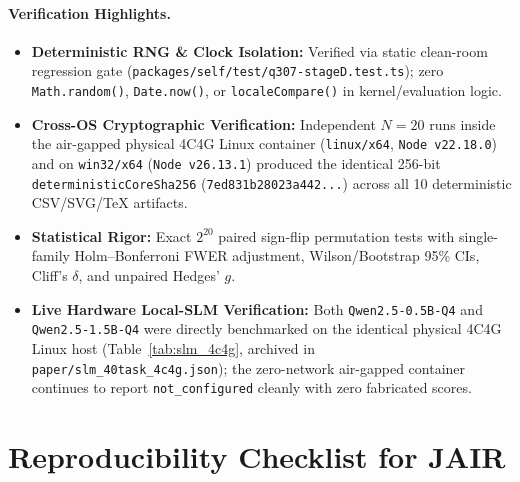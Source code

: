 \paragraph{Verification Highlights.}
\begin{itemize}
  \item \textbf{Deterministic RNG \& Clock Isolation:} Verified via static clean-room regression gate (\texttt{packages/\allowbreak self/\allowbreak test/\allowbreak q307-stageD.test.ts}); zero \texttt{Math.random()}, \texttt{Date.now()}, or \texttt{localeCompare()} in kernel/evaluation logic.
  \item \textbf{Cross-OS Cryptographic Verification:} Independent $N=20$ runs inside the air-gapped physical 4C4G Linux container (\texttt{linux/x64}, \texttt{Node v22.18.0}) and on \texttt{win32/x64} (\texttt{Node v26.13.1}) produced the identical 256-bit \texttt{deterministicCoreSha256} (\texttt{7ed831b28023a442...}) across all 10 deterministic CSV/SVG/TeX artifacts.
  \item \textbf{Statistical Rigor:} Exact $2^{20}$ paired sign-flip permutation tests with single-family Holm--Bonferroni FWER adjustment, Wilson/Bootstrap 95\% CIs, Cliff's $\delta$, and unpaired Hedges' $g$.
  \item \textbf{Live Hardware Local-SLM Verification:} Both \texttt{Qwen2.5-0.5B-Q4} and \texttt{Qwen2.5-1.5B-Q4} were directly benchmarked on the identical physical 4C4G Linux host (Table~\ref{tab:slm_4c4g}, archived in \texttt{paper/\allowbreak slm\_40task\_4c4g.json}); the zero-network air-gapped container continues to report \texttt{not\_\allowbreak configured} cleanly with zero fabricated scores.
\end{itemize}

\section{Reproducibility Checklist for JAIR}
\label{app:jair_checklist}

